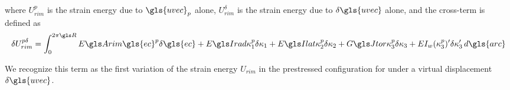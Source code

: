 \documentclass[\rootdir/thesis.tex]{subfiles}
\begin{document}
where $U_{rim}^p$ is the strain energy due to $\gls{uvec}_p$ alone, $U_{rim}^{\delta}$ is the strain energy due to $\delta\gls{uvec}$ alone, and the cross-term is defined as
\begin{equation}
\label{eq:U_rim_pd}
\delta U_{rim}^{p\delta} = \int_0^{2\pi \R}
	\EA\gls{ec}^p \delta\gls{ec} +
	\EIr\kappa_1^p\delta\kappa_1 +
	\EIl\kappa_2^p\delta\kappa_2 +
	\GJ\kappa_3^p\delta\kappa_3 +
	EI_w(\kappa_3^p)'\delta\kappa_3'\, d\gls{arc}
\end{equation}

We recognize this term as the first variation of the strain energy $U_{rim}$ in the prestressed configuration for under a virtual displacement $\delta\gls{uvec}$.




\end{document}
